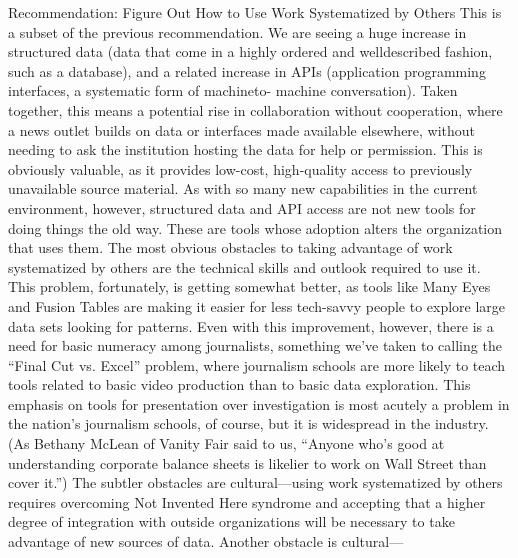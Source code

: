 Recommendation: Figure Out How to Use Work Systematized by Others
This is a subset of the previous recommendation. We are seeing a huge
increase in structured data (data that come in a highly ordered and welldescribed
fashion, such as a database), and a related increase in APIs
(application programming interfaces, a systematic form of machineto-
machine conversation). Taken together, this means a potential rise
in collaboration without cooperation, where a news outlet builds on
data or interfaces made available elsewhere, without needing to ask the
institution hosting the data for help or permission.
This is obviously valuable, as it provides low-cost, high-quality access
to previously unavailable source material. As with so many new capabilities
in the current environment, however, structured data and API
access are not new tools for doing things the old way. These are tools
whose adoption alters the organization that uses them.
The most obvious obstacles to taking advantage of work systematized
by others are the technical skills and outlook required to use it. This
problem, fortunately, is getting somewhat better, as tools like Many Eyes
and Fusion Tables are making it easier for less tech-savvy people to explore
large data sets looking for patterns. Even with this improvement,
however, there is a need for basic numeracy among journalists, something
we’ve taken to calling the ``Final Cut vs. Excel'' problem, where
journalism schools are more likely to teach tools related to basic video
production than to basic data exploration.
This emphasis on tools for presentation over investigation is most
acutely a problem in the nation’s journalism schools, of course, but it is
widespread in the industry. (As Bethany McLean of Vanity Fair said to
us, ``Anyone who’s good at understanding corporate balance sheets is
likelier to work on Wall Street than cover it.'')
The subtler obstacles are cultural—using work systematized by others
requires overcoming Not Invented Here syndrome and accepting that a
higher degree of integration with outside organizations will be necessary
to take advantage of new sources of data. Another obstacle is cultural—

